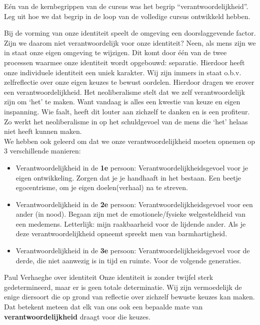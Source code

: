 \documentclass[main.tex]{subfiles}
\begin{document}
\begin{examenvraag}
    \begin{vraag}
        Eén van de kernbegrippen van de cursus was het begrip “verantwoordelijkheid”. Leg uit hoe we dat begrip in de loop van de volledige cursus ontwikkeld hebben.
    \end{vraag}

    \begin{antwoord}
	Bij de vorming van onze identiteit speelt de omgeving een doorslaggevende factor.‭ ‬Zijn we 
	daarom niet verantwoordelijk voor onze identiteit‭? ‬Neen,‭ ‬als mens zijn we in staat onze eigen 
	omgeving te wijzigen.‭ ‬Dit komt door één van de‭ ‬twee processen waarmee onze identiteit wordt 
	opgebouwd:‭ ‬separatie.‭ ‬Hierdoor heeft onze individuele identiteit een uniek karakter.‭ ‬Wij zijn 
	immers in staat o.b.v.‭ ‬zelfreflectie over onze eigen keuzes te bewust oordelen.‭ ‬Hierdoor dragen 
	we erover een verantwoordelijkheid.‭
	‬Het neoliberalisme stelt dat we zelf verantwoordelijk zijn om‭ ‬‘het‭’‬ te maken.‭ ‬Want vandaag is 
	alles een kwestie van keuze en eigen inspanning.‭ ‬Wie faalt,‭ ‬heeft dit louter aan zichzelf te 
	danken en is een profiteur.‭ ‬Zo werkt het neoliberalisme in op het schuldgevoel van de mens die‭ 
	‬‘het‭’‬ helaas niet heeft kunnen maken.\\
	We hebben ook geleerd om dat we onze verantwoordelijkheid moeten opnemen op 3 verschillende manieren:
	\begin{itemize}
		\item Verantwoordelijkheid in de \textbf{1e} persoon: Verantwoordelijkheidsgevoel voor je eigen ontwikkeling. Zorgen dat je je handhaaft in het bestaan.
		Een beetje egocentrisme, om je eigen doelen(verhaal) na te streven.
		\item Verantwoordelijkheid in de \textbf{2e} persoon: Verantwoordelijkheidsgevoel voor een ander (in nood). Begaan zijn met de emotionele/fysieke welgesteldheid
		van een medemens. Letterlijk: mijn raakbaarheid voor de lijdende ander. Als je deze verantwoordelijkheid
		opneemt spreekt men van barmhartigheid.
		\item Verantwoordelijkheid in de \textbf{3e} persoon: Verantwoordelijkheidsgevoel voor de derde, die niet aanwezig is in tijd en ruimte. Voor de volgende
		generaties.
	\end{itemize}
    \end{antwoord}
    \begin{citaat}{Paul Verhaeghe over identiteit}
    Onze
identiteit is zonder twijfel sterk gedetermineerd, maar er is geen totale determinatie. Wij zijn
vermoedelijk de enige diersoort die op grond van reflectie over zichzelf bewuste keuzes kan maken.
Dat betekent meteen dat elk van ons ook een bepaalde mate van \textbf{verantwoordelijkheid} draagt voor die
keuzes. 
    \end{citaat}
\end{examenvraag}
\end{document}
